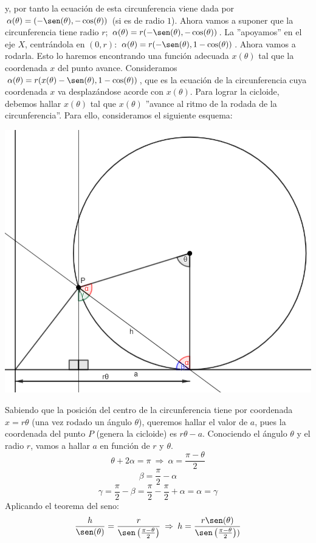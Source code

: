 \documentclass{article}
\begin{document}
y, por tanto la ecuación de esta circunferencia viene dada por $\alpha(\theta)=(-\sen(\theta),-\cos(\theta))$ (si es de radio $1$).
Ahora vamos a suponer que la circunferencia tiene radio $r$; $\alpha(\theta)=r(-\sen(\theta),-\cos(\theta))$.
La ''apoyamos'' en el eje $X$, centrándola en $(0,r)$: $\alpha(\theta)=r(-\sen(\theta),1-\cos(\theta))$.
Ahora vamos a rodarla. Esto lo haremos encontrando una función adecuada $x(\theta)$ tal que la coordenada $x$  del punto avance.
Consideramos $\alpha(\theta)=r(x(\theta)-\sen(\theta),1-\cos(\theta))$, que es la ecuación de la circunferencia cuya coordenada
$x$ va desplazándose acorde con $x(\theta)$. Para lograr la cicloide, debemos hallar $x(\theta)$ tal que $x(\theta)$
''avance al ritmo de la rodada de la circunferencia''. Para ello, consideramos el siguiente esquema:
\begin{center}
    \includegraphics[scale=0.3]{figuras/esquema.PNG}
\end{center}
Sabiendo que la posición del centro de la circunferencia tiene por coordenada $x=r\theta$ (una vez rodado un ángulo $\theta$),
queremos hallar el valor de $a$, pues la coordenada del punto $P$ (genera la cicloide) es $r\theta-a$.
Conociendo el ángulo $\theta$ y el radio $r$, vamos a hallar $a$ en función de $r$ y $\theta$.
$$
\theta + 2\alpha = \pi \: \Rightarrow \: \alpha=\frac{\pi-\theta}{2}
$$
$$
\beta = \frac{\pi}{2}-\alpha
$$
$$
\gamma=\frac{\pi}{2}-\beta=\frac{\pi}{2}-\frac{\pi}{2}+\alpha=\alpha=\gamma
$$
Aplicando el teorema del seno:
$$
\frac{h}{\sen(\theta)} = \frac{r}{\sen \left( \frac{\pi-\theta}{2} \right)} \: \Rightarrow \:
h = \frac{r \sen(\theta)}{\sen \left( \frac{\pi-\theta}{2} \right))}
$$
\end{document}
